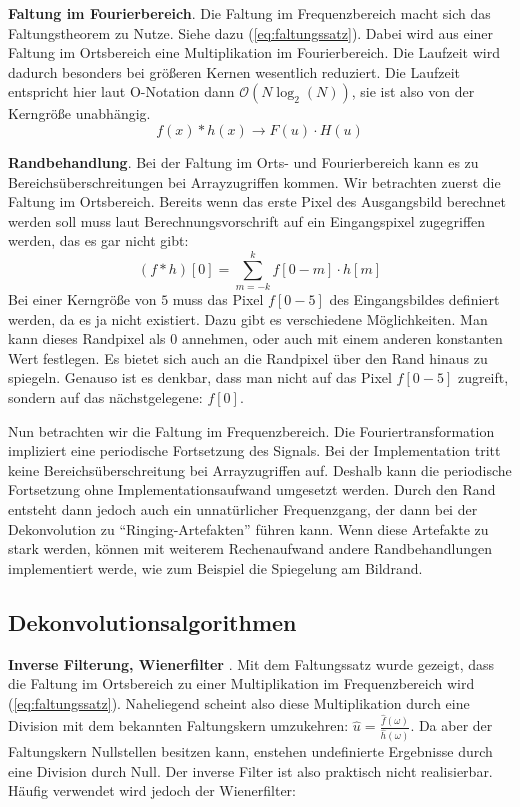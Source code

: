 \documentclass[a4paper,12pt]{article}
\begin{document}
\textbf{Faltung im Fourierbereich}. Die Faltung im Frequenzbereich macht
sich das Faltungstheorem zu Nutze. Siehe dazu (\ref{eq:faltungssatz}). Dabei wird aus
einer Faltung im Ortsbereich eine Multiplikation im Fourierbereich. Die Laufzeit
wird dadurch besonders bei größeren Kernen wesentlich reduziert. Die Laufzeit
entspricht hier laut O-Notation dann $\mathcal O(N\log_2 (N))$, sie ist also von
der Kerngröße unabhängig.
\begin{equation} \label{eq:faltungssatz}
f(x) * h(x) \rightarrow F(u) \cdot H(u)  
\end{equation}
 
\textbf{Randbehandlung}. Bei der Faltung im Orts- und Fourierbereich kann es zu
Bereichs\-überschreitungen bei Arrayzugriffen kommen. Wir betrachten
zuerst die Faltung im Ortsbereich. Bereits wenn das erste Pixel des Ausgangsbild
berechnet werden soll muss laut Berechnungsvorschrift auf ein Eingangspixel zugegriffen werden, das es gar nicht gibt: 
\begin{equation} \label{eq:randbehandlung}
(f*h)[0] = \sum_{m=-k}^{k} {f[0-m] \cdot h[m]}
\end{equation}
Bei einer Kerngröße von $5$ muss das Pixel $f[0-5]$ des Eingangsbildes definiert
werden, da es ja nicht existiert. Dazu gibt es verschiedene Möglichkeiten. Man
kann dieses Randpixel als $0$ annehmen, oder auch mit einem anderen konstanten
Wert festlegen. Es bietet sich auch an die Randpixel über den Rand hinaus zu
spiegeln. Genauso ist es denkbar, dass man nicht auf das Pixel $f[0-5]$
zugreift, sondern auf das nächstgelegene: $f[0]$.

Nun betrachten wir die Faltung im Frequenzbereich. Die Fouriertransformation
impliziert eine periodische Fortsetzung des Signals. Bei der Implementation tritt
keine Bereichsüberschreitung bei Arrayzugriffen auf. Deshalb kann die
periodische Fortsetzung ohne Implementationsaufwand umgesetzt werden. Durch den
Rand entsteht dann jedoch auch ein unnatürlicher Frequenzgang, der dann bei der
Dekonvolution zu "`Ringing-Artefakten"' führen kann. Wenn diese Artefakte zu
stark werden, können mit weiterem Rechenaufwand andere Randbehandlungen
implementiert werde, wie zum Beispiel die Spiegelung am Bildrand.


\subsection{Dekonvolutionsalgorithmen}\label{chp:algoritmen}

\textbf{Inverse Filterung, Wienerfilter }\cite{wiener}. 
Mit dem Faltungssatz wurde gezeigt, dass die Faltung im Ortsbereich
zu einer Multiplikation im Frequenzbereich wird (\ref{eq:faltungssatz}).
Naheliegend scheint also diese Multiplikation durch eine Division mit dem
bekannten Faltungskern umzukehren:  $\hat u = \frac{\hat{f}(\omega)}
{\hat{h}(\omega)}$. Da aber der Faltungskern Nullstellen besitzen kann, enstehen
undefinierte Ergebnisse durch eine Division durch Null. Der inverse Filter ist
also praktisch nicht realisierbar. Häufig verwendet wird jedoch der
Wienerfilter:
\end{document}
